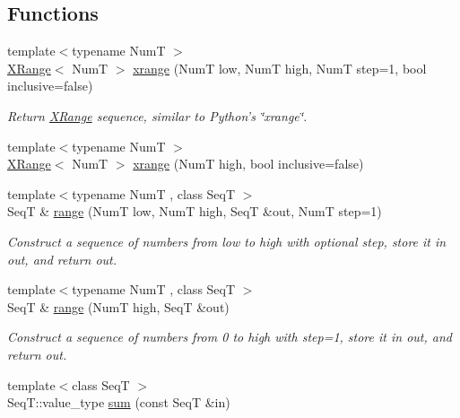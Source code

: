 \subsection*{Functions}
\begin{DoxyCompactItemize}
\item 
{\footnotesize template$<$typename Num\-T $>$ }\\\hyperlink{structseq_1_1math_1_1_x_range}{X\-Range}$<$ Num\-T $>$ \hyperlink{namespaceseq_1_1math_abfe793e999a374a4d5e6b1ef3f268b59}{xrange} (Num\-T low, Num\-T high, Num\-T step=1, bool inclusive=false)
\begin{DoxyCompactList}\small\item\em Return {\ttfamily \hyperlink{structseq_1_1math_1_1_x_range}{X\-Range}} sequence, similar to Python's \char`\"{}xrange\char`\"{}. \end{DoxyCompactList}\item 
{\footnotesize template$<$typename Num\-T $>$ }\\\hyperlink{structseq_1_1math_1_1_x_range}{X\-Range}$<$ Num\-T $>$ \hyperlink{namespaceseq_1_1math_a4f2c47e50ba86a80778ccebd31d7fa16}{xrange} (Num\-T high, bool inclusive=false)
\item 
{\footnotesize template$<$typename Num\-T , class Seq\-T $>$ }\\Seq\-T \& \hyperlink{namespaceseq_1_1math_a6bd86d848fb47f455aff84c38c175ea4}{range} (Num\-T low, Num\-T high, Seq\-T \&out, Num\-T step=1)
\begin{DoxyCompactList}\small\item\em Construct a sequence of numbers from {\ttfamily low} to {\ttfamily high} with optional {\ttfamily step}, store it in {\ttfamily out}, and return {\ttfamily out}. \end{DoxyCompactList}\item 
{\footnotesize template$<$typename Num\-T , class Seq\-T $>$ }\\Seq\-T \& \hyperlink{namespaceseq_1_1math_ae9b127e8277c6c390b99c4a1195dc087}{range} (Num\-T high, Seq\-T \&out)
\begin{DoxyCompactList}\small\item\em Construct a sequence of numbers from 0 to high with step=1, store it in {\ttfamily out}, and return {\ttfamily out}. \end{DoxyCompactList}\item 
{\footnotesize template$<$class Seq\-T $>$ }\\Seq\-T\-::value\-\_\-type \hyperlink{namespaceseq_1_1math_a27179daf6ca9a8d85434eda531fa134e}{sum} (const Seq\-T \&in)

\end{DoxyCompactItemize}
